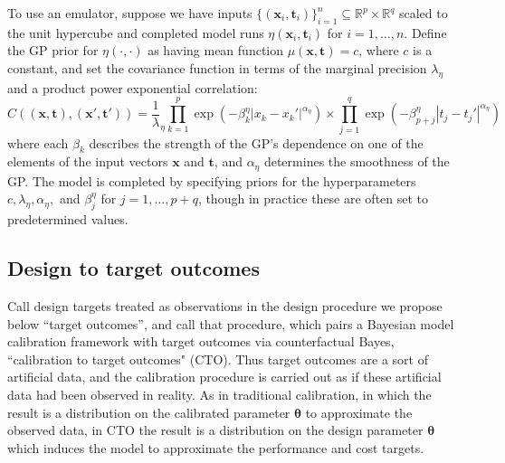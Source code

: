 \documentclass[12pt]{article}
\begin{document}
%
To use an emulator, suppose we have inputs $\{(\mathbf x_i,\mathbf t_i)\}_{i=1}^n\subseteq \mathbb R^p\times \mathbb R^q$ scaled to the 
unit hypercube and completed model runs 
%
$\eta\left(\mathbf x_i,\mathbf t_i\right)$ for $i=1,\ldots,n.$
%
Define the GP prior for $\eta(\cdot,\cdot)$ as having mean function $\mu(\mathbf x,\mathbf t)=c$, where $c$ is a constant, and
%
set the covariance function in terms of the marginal precision $\lambda_\eta$ and a product power exponential correlation:
%
\begin{equation}\label{eq:Hig_cov}
C((\mathbf x,\mathbf t),(\mathbf x',\mathbf t')) = \frac 1\lambda_\eta \prod_{k=1}^{p}
\exp \left(-\beta^\eta_k|x_k-x_k'|^{\alpha_\eta}\right) \times
\prod_{j=1}^{q}
\exp \left(-\beta^\eta_{p+j}|t_j-t_j'|^{\alpha_\eta}\right)
\end{equation}
%
where each $\beta_k$ describes the strength of the GP's dependence on one of the elements of the input vectors $\mathbf x$ and $\mathbf t$, and $\alpha_\eta$ determines the smoothness of the GP. 
%
The model is completed by specifying priors for the hyperparameters $c,\lambda_\eta,\alpha_\eta,$ and $\beta^\eta_j$ for $j=1,\ldots,p+q$, though in practice these are often set to predetermined values.
%

%
\subsection{Design to target outcomes}
%

%
Call design targets treated as observations in the design procedure we propose below ``target outcomes'', and call that procedure, which pairs a Bayesian model calibration framework with target outcomes via counterfactual Bayes, ``calibration to target outcomes" (CTO). 
%
Thus target outcomes are a sort of artificial data, and the calibration procedure is carried out as if these artificial data had been observed in reality.
%
As in traditional calibration, in which the result is a distribution on the calibrated parameter $\boldsymbol\theta$ to approximate the observed data, in CTO the result is a distribution on the design parameter $\boldsymbol\theta$ which induces the model to approximate the performance and cost targets.
%
%
%
%
%
\end{document}
